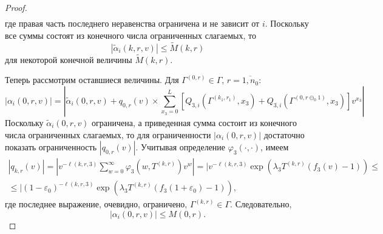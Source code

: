 \documentclass[a4paper,12pt,russian]{extarticle}
\begin{document}
\begin{proof}
\begin{multline*}
\end{multline*}
где правая часть последнего неравенства ограничена и не зависит от $i$.
Поскольку все суммы состоят из конечного числа ограниченных слагаемых, то
\begin{equation*}
|\tilde{\alpha}_i(k,r,v) | \leqslant \tilde{M}(k,r)
\end{equation*}
для некоторой конечной величины $\tilde{M}(k,r)$.

Теперь рассмотрим оставшиеся величины. Для $\Gamma^{(0,r)} \in \Gamma$, $r=\overline{1,n_0}$:
\begin{equation*}
|\alpha_i(0,r,v)| = | \tilde{\alpha}_i(0,r,v) + q_{0,r}(v) \times \sum_{x_3=0}^{L} \left[ Q_{3,i}(\Gamma^{(k_1,r_1)},x_3) + Q_{3,i}(\Gamma^{(0,r\ominus_0 1)},x_3) \right] v^{x_3}|
\end{equation*}
Поскольку $\tilde{\alpha}_i(0,r,v)$ ограничена, а приведенная сумма состоит из конечного числа ограниченных слагаемых, то для ограниченности $|\alpha_i(0,r,v)| $ достаточно показать ограниченность $|q_{0,r}(v)|$. Учитывая определение $\varphi_3(\cdot,\cdot)$, имеем
\begin{multline*}
|q_{k,r}(v)| = | v^{-\ell(k,r,3)}\sum_{w=0}^{\infty} \varphi_3(w,T^{(k,r)})v^w| = | v^ {-\ell(k,r,3)} \exp{(\lambda_3 T^{(k,r)} (f_3(v) - 1))}
\leqslant \\ 
\leqslant | (1-\varepsilon_0) ^ {-\ell(k,r,3)} \exp{(\lambda_3 T^{(k,r)} (f_3(1+\varepsilon_0) - 1))},
\end{multline*}
где последнее выражение, очевидно, ограничено, $\Gamma^{(k,r)} \in \Gamma$. Следовательно,
\begin{equation*}
|\alpha_i(0,r,v)| \leqslant M(0,r).
\end{equation*}


\end{proof}
\end{document}
